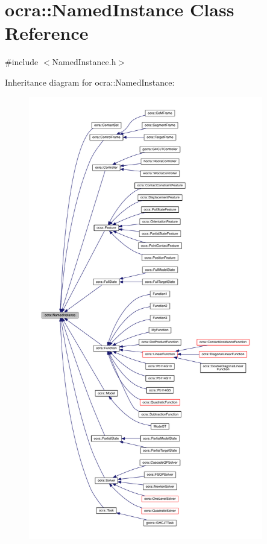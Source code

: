 \hypertarget{classocra_1_1NamedInstance}{}\section{ocra\+:\+:Named\+Instance Class Reference}
\label{classocra_1_1NamedInstance}


{\ttfamily \#include $<$Named\+Instance.\+h$>$}



Inheritance diagram for ocra\+:\+:Named\+Instance\+:\nopagebreak
\begin{figure}[H]
\begin{center}
\leavevmode
\includegraphics[height=550pt]{d0/de9/classocra_1_1NamedInstance__inherit__graph}
\end{center}
\end{figure}
